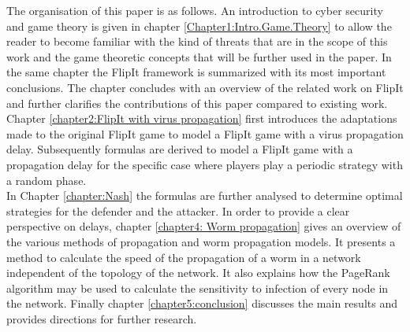The organisation of this paper is as follows. An introduction to cyber security and game theory is given in chapter \ref{Chapter1:Intro.Game.Theory} to allow the reader to become familiar with the kind of threats that are in the scope of this work and the game theoretic concepts that will be further used in the paper. In the same chapter the FlipIt framework is summarized with its most important conclusions. The chapter concludes with an overview of the related work on FlipIt and further clarifies the contributions of this paper compared to existing work. 
Chapter \ref{chapter2:FlipIt with virus propagation} first introduces the adaptations made to the original FlipIt game to model a FlipIt game with a virus propagation delay. Subsequently formulas are derived to model a FlipIt game with a propagation delay for the specific case where players play a periodic strategy with a random phase. \\
In Chapter \ref{chapter:Nash} the formulas are further analysed to determine optimal strategies for the defender and the attacker.
In order to provide a clear perspective on delays, chapter \ref{chapter4: Worm propagation} gives an overview of the various methods of propagation and worm propagation models. It presents a method to calculate the speed of the propagation of a worm in a network independent of the topology of the network. It also explains how the PageRank algorithm may be used to calculate the sensitivity to infection of every node in the network.
Finally chapter \ref{chapter5:conclusion} discusses the main results and provides directions for further research.


%
% 
%
%
%
% 
%
%
% 



